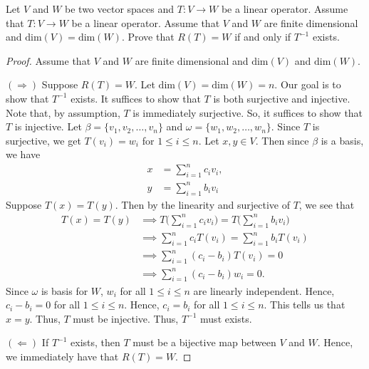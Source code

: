 \documentclass[a4paper]{article}
\begin{document}
\begin{problem}[ii]
        Let \( V  \) and \( W  \) be two vector spaces and \( T : V \to W  \) be a linear operator. Assume that \( T: V \to W  \) be a linear operator. Assume that \( V  \) and \( W  \) are finite dimensional and \( \text{dim}(V) = \text{dim}(W) \). Prove that \( R(T) = W  \) if and only if \( T^{-1} \) exists.

\end{problem}
\begin{proof}
    Assume that \( V  \) and \( W  \) are finite dimensional and \( \text{dim}(V) \) and \( \text{dim}(W) \).

\( (\Longrightarrow) \) Suppose \( R(T) = W  \). Let \( \text{dim}(V) = \text{dim}(W) = n \). Our goal is to show that \( T^{-1} \) exists. It suffices to show that \( T  \) is both surjective and injective. Note that, by assumption, \( T  \) is immediately surjective. So, it suffices to show that \( T  \) is injective. Let \( \beta = \{ {v}_{1}, {v}_{2}, \dots, {v}_{n} \}  \) and \( \omega = \{ {w}_{1}, {w}_{2}, \dots, {w}_{n} \} \). Since \( T  \) is surjective, we get \( T({v}_{i}) = {w}_{i} \) for \( 1 \leq i \leq n  \). Let \( x,y \in V \). Then since \( \beta \) is a basis, we have   
\begin{align*}
    x &= \sum_{ i=1  }^{ n } {c}_{i} {v}_{i}, \\
    y &= \sum_{ i=1  }^{ n } {b}_{i} {v}_{i}
\end{align*}
Suppose \( T(x) = T(y) \). Then by the linearity and surjective of \( T  \), we see that
\begin{align*}
    T(x) = T(y) &\implies T \Big(  \sum_{ i=1  }^{ n } {c}_{i} {v}_{i}  \Big) = T \Big(  \sum_{ i=1  }^{ n } {b}_{i} {v}_{i} \Big) \\
                &\implies \sum_{ i=1  }^{ n } {c}_{i} T({v}_{i}) = \sum_{ i=1  }^{ n } {b}_{i} T({v}_{i}) \\
                &\implies \sum_{ i=1  }^{ n } ({c}_{i} - {b}_{i}) T({v}_{i}) = 0  \\
                &\implies \sum_{ i=1  }^{ n } ({c}_{i} - {b}_{i}) {w}_{i} = 0.
\end{align*}
Since \( \omega \) is basis for \( W  \), \( {w}_{i}  \) for all \( 1 \leq i \leq n  \) are linearly independent. Hence, \( {c}_{i}  - {b}_{i} = 0  \) for all \( 1 \leq i \leq n  \). Hence, \( {c}_{i} = {b}_{i} \) for all \( 1 \leq i \leq n  \). This tells us that \( x = y \). Thus, \( T  \) must be injective. Thus, \( T^{-1}  \) must exists.

\( (\Longleftarrow) \) If \( T^{-1} \) exists, then \( T  \) must be a bijective map between \( V  \) and \( W  \). Hence, we immediately have that \( R(T) = W  \). 


\end{proof}
\end{document}
